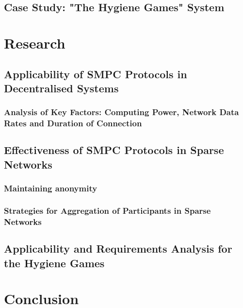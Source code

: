 	\section{Case Study: "The Hygiene Games" System}

\chapter{Research}
	\section{Applicability of SMPC Protocols in Decentralised Systems}
	
	\subsection*{Analysis of Key Factors: Computing Power, Network Data Rates and Duration of Connection}
	\section{Effectiveness of SMPC Protocols in Sparse Networks}
	\subsection*{Maintaining anonymity}
	\subsection*{Strategies for Aggregation of Participants in Sparse Networks}
	\section{Applicability and Requirements Analysis for the Hygiene Games}

\chapter{Conclusion}

\clearpage

\printbibliography

